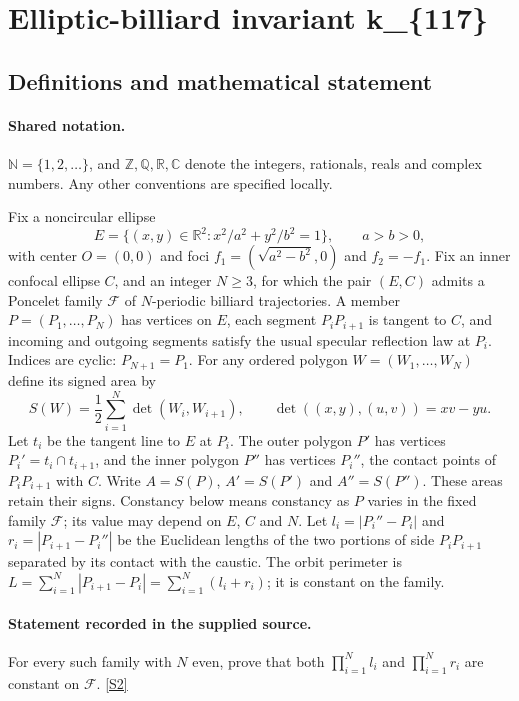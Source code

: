 \documentclass[11pt]{article}
\newcommand{\sref}[2]{\hyperlink{source:#1:#2}{[S#2]}}
\begin{document}
\section{Elliptic-billiard invariant k\_\{117\}}\label{statement}

\subsection{Definitions and mathematical statement}

\paragraph{Shared notation.}$\mathbb N=\{1,2,\ldots\}$, and $\mathbb Z,\mathbb Q,\mathbb R,\mathbb C$ denote the integers, rationals, reals and complex numbers. Any other conventions are specified locally.


Fix a noncircular ellipse
\[
E=\{(x,y)\in\mathbb R^2:x^2/a^2+y^2/b^2=1\},\qquad a>b>0,
\]
with center $O=(0,0)$ and foci $f_1=(\sqrt{a^2-b^2},0)$ and $f_2=-f_1$. Fix an inner confocal ellipse $C$, and an integer $N\geq3$, for which the pair $(E,C)$ admits a Poncelet family $\mathcal F$ of $N$-periodic billiard trajectories. A member $P=(P_1,\ldots,P_N)$ has vertices on $E$, each segment $P_iP_{i+1}$ is tangent to $C$, and incoming and outgoing segments satisfy the usual specular reflection law at $P_i$. Indices are cyclic: $P_{N+1}=P_1$.
For any ordered polygon $W=(W_1,\ldots,W_N)$ define its signed area by
\[
S(W)=\frac12\sum_{i=1}^N\det(W_i,W_{i+1}),\qquad
\det((x,y),(u,v))=xv-yu.
\]
Let $t_i$ be the tangent line to $E$ at $P_i$. The outer polygon $P'$ has vertices $P_i'=t_i\cap t_{i+1}$, and the inner polygon $P''$ has vertices $P_i''$, the contact points of $P_iP_{i+1}$ with $C$. Write $A=S(P)$, $A'=S(P')$ and $A''=S(P'')$. These areas retain their signs. Constancy below means constancy as $P$ varies in the fixed family $\mathcal F$; its value may depend on $E$, $C$ and $N$.
Let $l_i=|P_i''-P_i|$ and $r_i=|P_{i+1}-P_i''|$ be the Euclidean lengths of the two portions of side $P_iP_{i+1}$ separated by its contact with the caustic. The orbit perimeter is $L=\sum_{i=1}^N|P_{i+1}-P_i|=\sum_{i=1}^N(l_i+r_i)$; it is constant on the family.
\paragraph{Statement recorded in the supplied source.}
For every such family with $N$ even, prove that both $\displaystyle\prod_{i=1}^N l_i$ and $\displaystyle\prod_{i=1}^N r_i$ are constant on $\mathcal F$. \sref{statement}{2}
\end{document}
